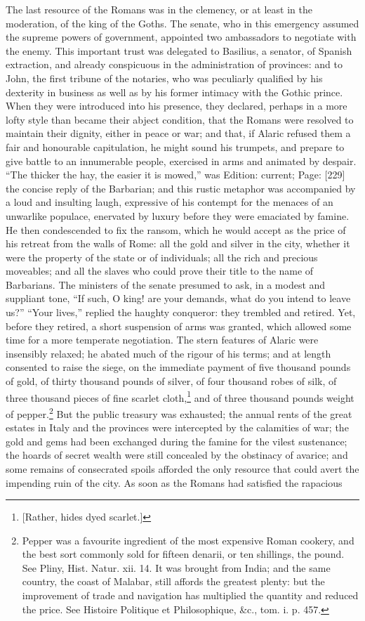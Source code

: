 The last resource of the Romans was in the clemency, or at least in the moderation, of the king of the Goths. The senate, who in this emergency assumed the supreme powers of government, appointed two ambassadors to negotiate with the enemy. This important trust was delegated to Basilius, a senator, of Spanish extraction, and already conspicuous in the administration of provinces: and to John, the first tribune of the notaries, who was peculiarly qualified by his dexterity in business as well as by his former intimacy with the Gothic prince. When they were introduced into his presence, they declared, perhaps in a more lofty style than became their abject condition, that the Romans were resolved to maintain their dignity, either in peace or war; and that, if Alaric refused them a fair and honourable capitulation, he might sound his trumpets, and prepare to give battle to an innumerable people, exercised in arms and animated by despair. \texthebrew{“}The thicker the hay, the easier it is mowed,\texthebrew{}” was Edition: current; Page: [229] the concise reply of the Barbarian; and this rustic metaphor was accompanied by a loud and insulting laugh, expressive of his contempt for the menaces of an unwarlike populace, enervated by luxury before they were emaciated by famine. He then condescended to fix the ransom, which he would accept as the price of his retreat from the walls of Rome: all the gold and silver in the city, whether it were the property of the state or of individuals; all the rich and precious moveables; and all the slaves who could prove their title to the name of Barbarians. The ministers of the senate presumed to ask, in a modest and suppliant tone, \texthebrew{“}If such, O king! are your demands, what do you intend to leave us?\texthebrew{” “}Your lives,\texthebrew{}” replied the haughty conqueror: they trembled and retired. Yet, before they retired, a short suspension of arms was granted, which allowed some time for a more temperate negotiation. The stern features of Alaric were insensibly relaxed; he abated much of the rigour of his terms; and at length consented to raise the siege, on the immediate payment of five thousand pounds of gold, of thirty thousand pounds of silver, of four thousand robes of silk, of three thousand pieces of fine scarlet cloth,\footnote{[Rather, hides dyed scarlet.]} and of three thousand pounds weight of pepper.\footnote{Pepper was a favourite ingredient of the most expensive Roman cookery, and the best sort commonly sold for fifteen denarii, or ten shillings, the pound. See Pliny, Hist. Natur. xii. 14. It was brought from India; and the same country, the coast of Malabar, still affords the greatest plenty: but the improvement of trade and navigation has multiplied the quantity and reduced the price. See Histoire Politique et Philosophique, \&c., tom. i. p. 457.} But the public treasury was exhausted; the annual rents of the great estates in Italy and the provinces were intercepted by the calamities of war; the gold and gems had been exchanged during the famine for the vilest sustenance; the hoards of secret wealth were still concealed by the obstinacy of avarice; and some remains of consecrated spoils afforded the only resource that could avert the impending ruin of the city. As soon as the Romans had satisfied the rapacious 